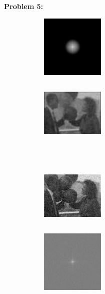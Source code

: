 \documentclass[11pt]{article}
\newenvironment{problem}[1]{\textbf{Problem #1: }}{\newpage}
\begin{document}
\begin{problem}{5}
\begin{enumerate}[label = (\alph*)]
\begin{figure}[h!]
\begin{subfigure}[h!]{.18\textwidth}
					\caption{}
				\end{subfigure}
				\begin{subfigure}[h!]{.18\textwidth}
					\centering
					\includegraphics[height = 3cm, width = 3cm]{Figures/Prob5/Green/6}
					\caption{}
				\end{subfigure}
				\begin{subfigure}[h!]{.18\textwidth}
					\centering
					\includegraphics[height = 3cm, width = 3cm]{Figures/Prob5/Green/8}
					\caption{}
				\end{subfigure}
			\end{figure}
			\\ 
			\begin{figure}[h!]
				\centering
				\begin{subfigure}[h!]{.18\textwidth}
					\centering
					\includegraphics[height = 3cm, width = 3cm]{Figures/Prob5/Blue/1}
					\caption{}
				\end{subfigure}
				\begin{subfigure}[h!]{.18\textwidth}
					\centering
					\includegraphics[height = 3cm, width = 3cm]{Figures/Prob5/Blue/4}
					\caption{}
				\end{subfigure}
				\begin{subfigure}[h!]{.18\textwidth}

\end{subfigure}
\end{figure}
\end{enumerate}
\end{problem}
\end{document}
